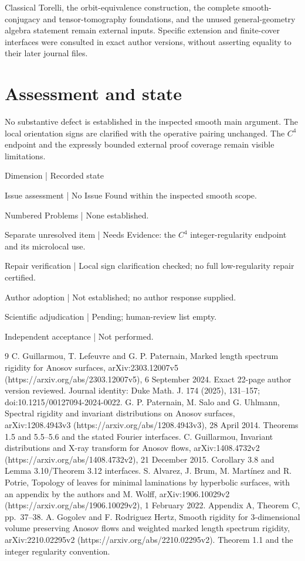 \documentclass[10pt]{article}
\begin{document}
Classical Torelli, the orbit-equivalence construction, the complete smooth-conjugacy and tensor-tomography foundations, and the unused general-geometry algebra statement remain external inputs. Specific extension and finite-cover interfaces were consulted in exact author versions, without asserting equality to their later journal files.\par
\section*{Assessment and state}
No substantive defect is established in the inspected smooth main argument. The local orientation signs are clarified with the operative pairing unchanged. The \(C^4\) endpoint and the expressly bounded external proof coverage remain visible limitations.\par
Dimension | Recorded state\par
Issue assessment | No Issue Found within the inspected smooth scope.\par
Numbered Problems | None established.\par
Separate unresolved item | Needs Evidence: the \(C^4\) integer-regularity endpoint and its microlocal use.\par
Repair verification | Local sign clarification checked; no full low-regularity repair certified.\par
Author adoption | Not established; no author response supplied.\par
Scientific adjudication | Pending; human-review list empty.\par
Independent acceptance | Not performed.\par
9 C. Guillarmou, T. Lefeuvre and G. P. Paternain, Marked length spectrum rigidity for Anosov surfaces, arXiv:2303.12007v5 (https://arxiv.org/abs/2303.12007v5), 6 September 2024. Exact 22-page author version reviewed. Journal identity: Duke Math. J. 174 (2025), 131–157; doi:10.1215/00127094-2024-0022. G. P. Paternain, M. Salo and G. Uhlmann, Spectral rigidity and invariant distributions on Anosov surfaces, arXiv:1208.4943v3 (https://arxiv.org/abs/1208.4943v3), 28 April 2014. Theorems 1.5 and 5.5–5.6 and the stated Fourier interfaces. C. Guillarmou, Invariant distributions and X-ray transform for Anosov flows, arXiv:1408.4732v2 (https://arxiv.org/abs/1408.4732v2), 21 December 2015. Corollary 3.8 and Lemma 3.10/Theorem 3.12 interfaces. S. Alvarez, J. Brum, M. Martínez and R. Potrie, Topology of leaves for minimal laminations by hyperbolic surfaces, with an appendix by the authors and M. Wolff, arXiv:1906.10029v2 (https://arxiv.org/abs/1906.10029v2), 1 February 2022. Appendix A, Theorem C, pp. 37–38. A. Gogolev and F. Rodriguez Hertz, Smooth rigidity for 3-dimensional volume preserving Anosov flows and weighted marked length spectrum rigidity, arXiv:2210.02295v2 (https://arxiv.org/abs/2210.02295v2). Theorem 1.1 and the integer regularity convention.\par
\end{document}

